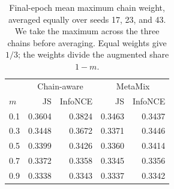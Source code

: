 \begin{table}[H]
\centering\small
\begin{tabular}{lrrrr}
\toprule
 & \multicolumn{2}{c}{Chain-aware} & \multicolumn{2}{c}{MetaMix} \\
$m$ & JS & InfoNCE & JS & InfoNCE \\
\midrule
0.1 & 0.3604 & 0.3824 & 0.3463 & 0.3437 \\
0.3 & 0.3448 & 0.3672 & 0.3371 & 0.3446 \\
0.5 & 0.3399 & 0.3426 & 0.3360 & 0.3414 \\
0.7 & 0.3372 & 0.3358 & 0.3345 & 0.3356 \\
0.9 & 0.3338 & 0.3343 & 0.3337 & 0.3342 \\
\bottomrule
\end{tabular}
\caption{Final-epoch mean maximum chain weight, averaged equally over seeds 17, 23, and 43. We take the maximum across the three chains before averaging. Equal weights give $1/3$; the weights divide the augmented share $1-m$.}\label{tab:weights}
\end{table}
